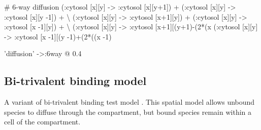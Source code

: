 \begin{kappasource}


# 6-way diffusion
    (:cytosol [x][y] -> :cytosol [x][y+1]) + (:cytosol [x][y] -> :cytosol [x][y -1]) + {\textbackslash}
    (:cytosol [x][y] -> :cytosol [x+1][y]) + (:cytosol [x][y] -> :cytosol [x -1][y]) + {\textbackslash}
    (:cytosol [x][y] -> :cytosol [x+1][(y+1)-(2*(x%
    (:cytosol [x][y] -> :cytosol [x -1][(y -1)+(2*((x -1)%

'diffusion' ->:6way @ 0.4


\end{kappasource}


\subsection{Bi-trivalent binding model}
\label{sec:bitrivalent}


A variant of bi-trivalent binding test model \citep{yang2008kinetic}. This spatial model allows unbound species to diffuse through the compartment, but bound species remain within a cell of the compartment.


